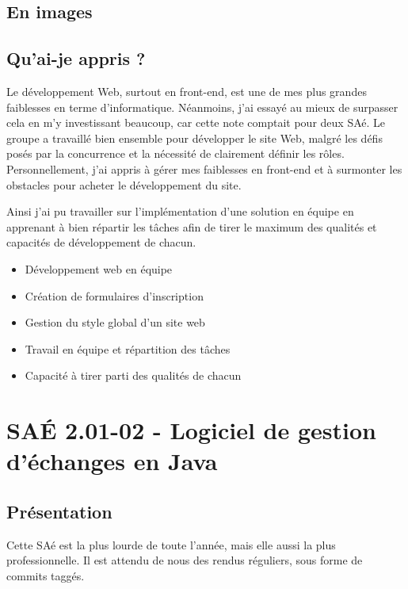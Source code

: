 \documentclass{mytex}
\begin{document}
\subsection{En images}

\subsection{Qu'ai-je appris ?}

Le développement Web, surtout en front-end, est une de mes plus grandes faiblesses en terme d'informatique. Néanmoins, j'ai essayé au mieux de surpasser cela en m'y investissant beaucoup, car cette note comptait pour deux SAé. Le groupe a travaillé bien ensemble pour développer le site Web, malgré les défis posés par la concurrence et la nécessité de clairement définir les rôles. Personnellement, j'ai appris à gérer mes faiblesses en front-end et à surmonter les obstacles pour acheter le développement du site.

Ainsi j'ai pu travailler sur l'implémentation d'une solution en équipe en apprenant à bien répartir les tâches afin de tirer le maximum des qualités et capacités de développement de chacun.

\begin{itemize}
	\item Développement web en équipe
	\item Création de formulaires d'inscription
	\item Gestion du style global d'un site web
\end{itemize}

\begin{itemize}
	\item Travail en équipe et répartition des tâches
	\item Capacité à tirer parti des qualités de chacun
\end{itemize}

\section{SAÉ 2.01-02 - Logiciel de gestion d'échanges en Java}

\subsection{Présentation}

Cette SAé est la plus lourde de toute l'année, mais elle aussi la plus professionnelle.
Il est attendu de nous des rendus réguliers, sous forme de commits taggés.
\end{document}
